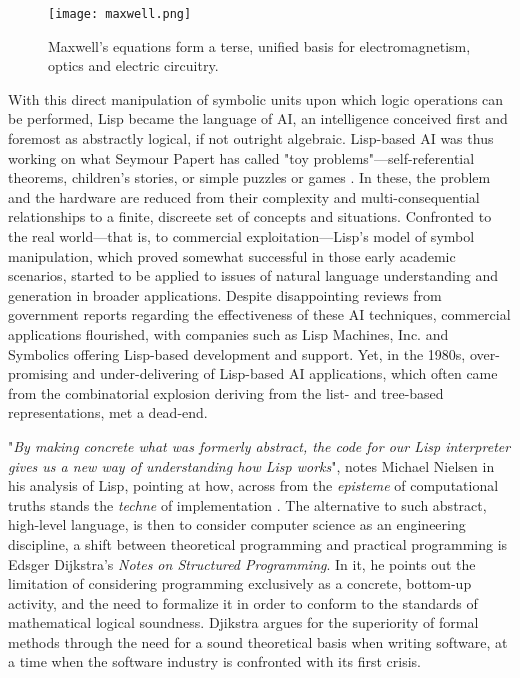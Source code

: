 \begin{figure}
  \texttt{[image: maxwell.png]}
  \caption{Maxwell's equations form a terse, unified basis for electromagnetism, optics and electric circuitry.}
  \label{graphic:maxwell-equations}
\end{figure}

With this direct manipulation of symbolic units upon which logic operations can be performed, Lisp became the language of AI, an intelligence conceived first and foremost as abstractly logical, if not outright algebraic. Lisp-based AI was thus working on what Seymour Papert has called "toy problems"—self-referential theorems, children's stories, or simple puzzles or games \citep{nilsson_early_2009}. In these, the problem and the hardware are reduced from their complexity and multi-consequential relationships to a finite, discreete set of concepts and situations. Confronted to the real world—that is, to commercial exploitation—Lisp's model of symbol manipulation, which proved somewhat successful in those early academic scenarios, started to be applied to issues of natural language understanding and generation in broader applications. Despite disappointing reviews from government reports regarding the effectiveness of these AI techniques, commercial applications flourished, with companies such as Lisp Machines, Inc. and Symbolics offering Lisp-based development and support. Yet, in the 1980s, over-promising and under-delivering of Lisp-based AI applications, which often came from the combinatorial explosion deriving from the list- and tree-based representations, met a dead-end.

"\emph{By making concrete what was formerly abstract, the code for our Lisp interpreter gives us a new way of understanding how Lisp works}", notes Michael Nielsen in his analysis of Lisp, pointing at how, across from the \emph{episteme} of computational truths stands the \emph{techne} of implementation \citep{nielsen_lisp_2012}. The alternative to such abstract, high-level language, is then to consider computer science as an engineering discipline, a shift between theoretical programming and practical programming is Edsger Dijkstra's \emph{Notes on Structured Programming}. In it, he points out the limitation of considering programming exclusively as a concrete, bottom-up activity, and the need to formalize it in order to conform to the standards of mathematical logical soundness. Djikstra argues for the superiority of formal methods through the need for a sound theoretical basis when writing software, at a time when the software industry is confronted with its first crisis.

